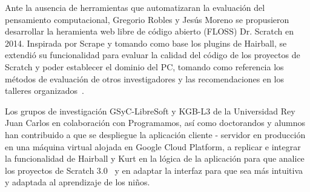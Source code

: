 \documentclass[a4paper, 12pt]{book}
\begin{document}
Ante la ausencia de herramientas que automatizaran la evaluación del pensamiento computacional, Gregorio Robles y Jesús Moreno se propusieron desarrollar la heramienta web libre de código abierto (FLOSS) 
Dr. Scratch en 2014. Inspirada por Scrape y tomando como base los plugins de Hairball, se extendió su funcionalidad para evaluar la calidad del código de los proyectos de Scratch y poder establecer el dominio del PC, tomando como referencia los métodos de evaluación de otros investigadores y las recomendaciones en los talleres organizados~\cite{moreno2015dr}. %

Los grupos de investigación GSyC-LibreSoft y KGB-L3 de la Universidad Rey Juan Carlos en colaboración con Programamos, así como doctorandos y alumnos han contribuido a que se despliegue la aplicación cliente - servidor en producción en una  máquina virtual alojada en Google Cloud Platform, a replicar e integrar la funcionalidad de Hairball y Kurt en la lógica de la aplicación para que analice los proyectos de Scratch 3.0~\cite{vargas2020analysis} y en adaptar la interfaz para que sea más intuitiva y adaptada al aprendizaje de los niños. 
\end{document}
